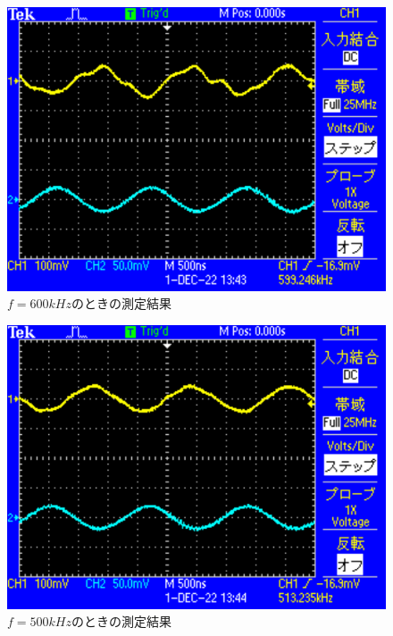 \begin{figure}[H]
    \centering
    \includegraphics[scale=0.5]{TEK0005.pdf}
    \caption{$f=600\si{kHz}$のときの測定結果}
\end{figure}

\begin{figure}[H]
    \centering
    \includegraphics[scale=0.5]{TEK0006.pdf}
    \caption{$f=500\si{kHz}$のときの測定結果}
\end{figure}